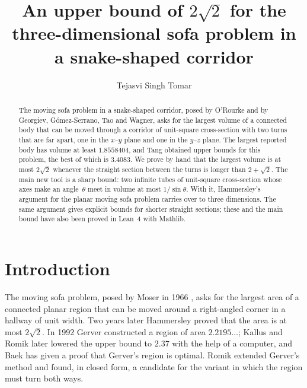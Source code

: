 \documentclass[11pt]{amsart}
\theoremstyle{definition}
\theoremstyle{remark}
\numberwithin{equation}{section}
\begin{document}
\title[The sofa problem in a snake-shaped corridor]{An upper bound of $2\sqrt{2}$ for the three-dimensional sofa problem in a snake-shaped corridor}
\author{Tejasvi Singh Tomar}
\renewcommand{\urladdrname}{{\itshape ORCID}}

\begin{abstract}
The moving sofa problem in a snake-shaped corridor, posed by O'Rourke and by Georgiev, G\'omez-Serrano, Tao and Wagner, asks for the largest volume of a connected body that can be moved through a corridor of unit-square cross-section with two turns that are far apart, one in the $x$--$y$ plane and one in the $y$--$z$ plane. The largest reported body has volume at least $1.8558404$, and Tang obtained upper bounds for this problem, the best of which is $3.4083$. We prove by hand that the largest volume is at most $2\sqrt2$ whenever the straight section between the turns is longer than $2+\sqrt2$. The main new tool is a sharp bound: two infinite tubes of unit-square cross-section whose axes make an angle~$\theta$ meet in volume at most $1/\sin\theta$. With it, Hammersley's argument for the planar moving sofa problem carries over to three dimensions. The same argument gives explicit bounds for shorter straight sections; these and the main bound have also been proved in Lean~4 with Mathlib.
\end{abstract}

\maketitle

\section{Introduction}\label{sec:intro}

The moving sofa problem, posed by Moser in 1966 \cite{Mos66}, asks for the largest area of a connected planar region that can be moved around a right-angled corner in a hallway of unit width. Two years later Hammersley \cite{Ham68} proved that the area is at most $2\sqrt2$. In 1992 Gerver \cite{Ger92} constructed a region of area $2.2195\ldots$; Kallus and Romik \cite{KR18} later lowered the upper bound to $2.37$ with the help of a computer, and Baek \cite{Bae24} has given a proof that Gerver's region is optimal. Romik \cite{Rom18} extended Gerver's method and found, in closed form, a candidate for the variant in which the region must turn both ways.
\end{document}
